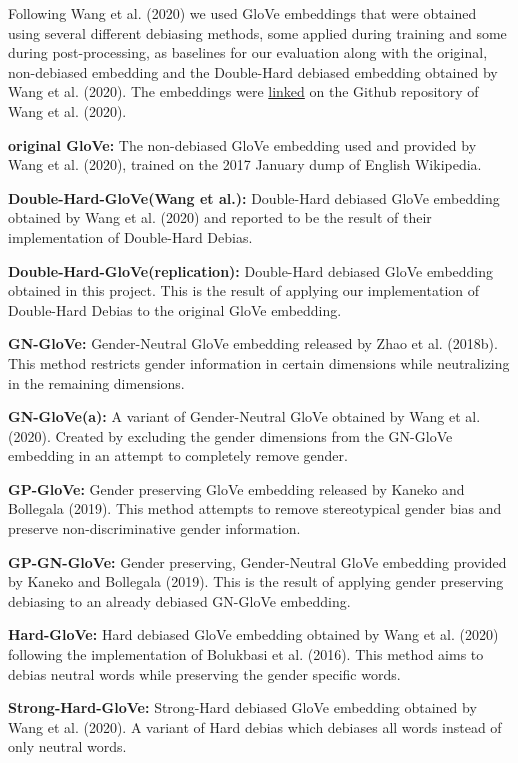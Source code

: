 \documentclass[
  english,
  man,floatsintext]{apa6}
\begin{document}
Following Wang et al. (2020) we used GloVe embeddings that were obtained using several different debiasing methods, some applied during training and some during post-processing, as baselines for our evaluation along with the original, non-debiased embedding and the Double-Hard debiased embedding obtained by Wang et al. (2020). The embeddings were \href{http://www.cs.virginia.edu/~tw8cb/word_embeddings/}{linked} on the Github repository of Wang et al. (2020).

\textbf{original GloVe:} The non-debiased GloVe embedding used and provided by Wang et al. (2020), trained on the 2017 January dump of English Wikipedia.

\textbf{Double-Hard-GloVe(Wang et al.):} Double-Hard debiased GloVe embedding obtained by Wang et al. (2020) and reported to be the result of their implementation of Double-Hard Debias.

\textbf{Double-Hard-GloVe(replication):} Double-Hard debiased GloVe embedding obtained in this project. This is the result of applying our implementation of Double-Hard Debias to the original GloVe embedding.

\textbf{GN-GloVe:} Gender-Neutral GloVe embedding released by Zhao et al. (2018b). This method restricts gender information in certain dimensions while neutralizing in the remaining dimensions.

\textbf{GN-GloVe(a):} A variant of Gender-Neutral GloVe obtained by Wang et al. (2020). Created by excluding the gender dimensions from the GN-GloVe embedding in an attempt to completely remove gender.

\textbf{GP-GloVe:} Gender preserving GloVe embedding released by Kaneko and Bollegala (2019). This method attempts to remove stereotypical gender bias and preserve non-discriminative gender information.

\textbf{GP-GN-GloVe:} Gender preserving, Gender-Neutral GloVe embedding provided by Kaneko and Bollegala (2019). This is the result of applying gender preserving debiasing to an already debiased GN-GloVe embedding.

\textbf{Hard-GloVe:} Hard debiased GloVe embedding obtained by Wang et al. (2020) following the implementation of Bolukbasi et al. (2016). This method aims to debias neutral words while preserving the gender specific words.

\textbf{Strong-Hard-GloVe:} Strong-Hard debiased GloVe embedding obtained by Wang et al. (2020). A variant of Hard debias which debiases all words instead of only neutral words.
\end{document}
